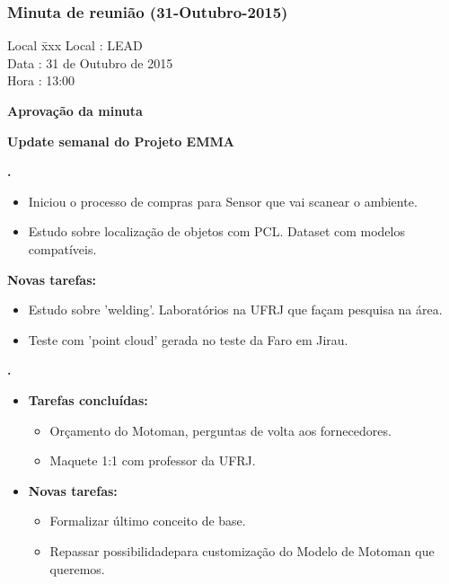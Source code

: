 \subsubsection{Minuta de reunião (31-Outubro-2015)}

\begin{tabbing}
  Local \= xxx \kill
  Local \> : LEAD \\
  Data  \> : 31 de Outubro de 2015 \\
  Hora  \> : 13:00
\end{tabbing} 


\textbf{Aprovação da minuta}

\textbf{Update semanal do Projeto EMMA}
   									
						
\textbf{\gabriel.} 
	\begin{itemize}
			\item Iniciou o processo de compras para Sensor que vai scanear o ambiente.
			\item Estudo sobre localização de objetos com PCL. Dataset com modelos
			compatíveis.
			\end{itemize}
		
		\item \textbf{Novas tarefas:}
			\begin{itemize} 
				\item Estudo sobre 'welding'. Laboratórios na UFRJ que façam pesquisa na
				área.
				\item Teste com 'point cloud' gerada no teste da Faro em Jirau.
			\end{itemize}

					
			
   \textbf{.} 
	\begin{itemize}
		\item \textbf{Tarefas concluídas:}
			\begin{itemize}    
				\item Orçamento do Motoman, perguntas de volta aos fornecedores.
				\item Maquete 1:1 com professor da UFRJ.
				
			\end{itemize}
		
		\item \textbf{Novas tarefas:}
			\begin{itemize} 
			    \item Formalizar último conceito de base.
			    \item Repassar possibilidadepara customização do Modelo de Motoman que
			    queremos.
			\end{itemize}
	\end{itemize}

